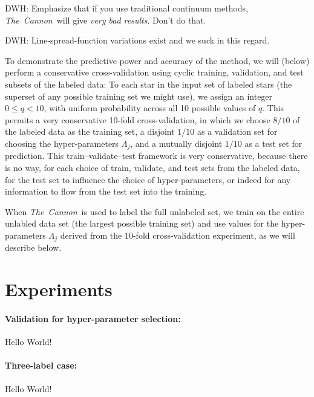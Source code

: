 \documentclass[12pt,preprint]{aastex}
\newcommand{\project}[1]{\textsl{#1}}
\newcommand{\TheCannon}{\project{The~Cannon}}
\begin{document}
DWH: Emphasize that if you use traditional continuum methods,
\TheCannon\ will give \emph{very bad results}.  Don't do that.

DWH: Line-spread-function variations exist and we suck in this regard.



To demonstrate the predictive power and accuracy of the method, we
will (below) perform a conservative cross-validation using cyclic
training, validation, and test subsets of the labeled data:
To each star in the input set of labeled stars (the superset of any
possible training set we might use), we assign an integer $0\leq
q<10$, with uniform probability across all 10 possible values of $q$.
This permits a very conservative 10-fold cross-validation, in which we
choose $8/10$ of the labeled data as the training set, a disjoint
$1/10$ as a validation set for choosing the hyper-parameters
$\Lambda_j$, and a mutually disjoint $1/10$ as a test set for
prediction.
This train--validate--test framework is very conservative, because there
is no way, for each choice of train, validate, and test sets from the
labeled data, for the test set to influence the choice of
hyper-parameters, or indeed for any information to flow from the test
set into the training.

When \TheCannon\ is used to label the full unlabeled set, we train on
the entire unlabled data set (the largest possible training set) and
use values for the hyper-parameters $\Lambda_j$ derived from the
10-fold cross-validation experiment, as we will describe below.


\section{Experiments}

\paragraph{Validation for hyper-parameter selection:}
Hello World!

\paragraph{Three-label case:}
Hello World!
\end{document}
